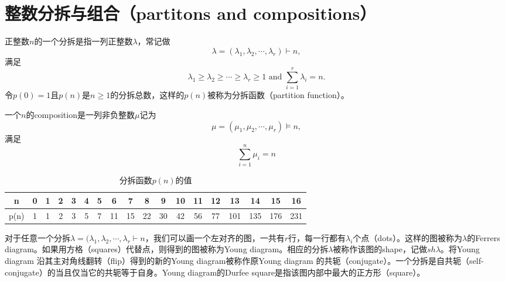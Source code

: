 \section{整数分拆与组合（partitons and compositions）}
\begin{definition}
	正整数$n$的一个分拆是指一列正整数$\lambda$，常记做
	\begin{equation*}
		\lambda = (\lambda_1, \lambda_2, \cdots, \lambda_r)\vdash n,
	\end{equation*}
	满足
	\begin{equation*}
		\lambda_1\geq \lambda_2\geq \cdots \geq \lambda_r\geq 1\text{ and }\sum\limits_{i=1}^r\lambda_i = n.
	\end{equation*}
	令$p(0) = 1$且$p(n)$是$n\geq 1$的分拆总数，这样的$p(n)$被称为分拆函数（partition function）。
\end{definition}
\begin{definition}
	一个$n$的composition是一列非负整数$\mu$记为
	\begin{equation*}
		\mu = (\mu_1, \mu_2, \cdots, \mu_r)\models n,
	\end{equation*}
	满足
	\begin{equation*}
		\sum\limits_{i=1}^n \mu_i = n
	\end{equation*}
\end{definition}
\begin{table}[h]
	\centering
	\begin{tabular}{|c|c|c|c|c|c|c|c|c|c|c|c|c|c|c|c|c|c|}
		\hline
		n & 0 & 1 & 2 & 3 & 4 & 5 & 6 & 7 & 8 & 9 & 10 & 11 & 12 & 13 & 14 & 15 & 16\\		
		\hline
		p(n) & 1 & 1 & 2 & 3 & 5 & 7 & 11 & 15 & 22 & 30 & 42 & 56 & 77 & 101 & 135 & 176 & 231\\
		\hline
	\end{tabular}
	\caption{分拆函数$p(n)$的值}
\end{table}
\begin{definition}
	对于任意一个分拆$\lambda = (\lambda_1, \lambda_2, \cdots, \lambda_r\vdash n$，我们可以画一个左对齐的图，一共有$r$行，每一行都有$\lambda_i$个点（dots）。这样的图被称为$\lambda$的Ferrers diagram。如果用方格（squares）代替点，则得到的图被称为Young diagram。相应的分拆$\lambda$被称作该图的shape，记做$sh\lambda$。将Young diagram 沿其主对角线翻转（flip）得到的新的Young diagram被称作原Young diagram 的共轭（conjugate）。一个分拆是自共轭（self-conjugate）的当且仅当它的共轭等于自身。Young diagram的Durfee square是指该图内部中最大的正方形（square）。
\end{definition}
